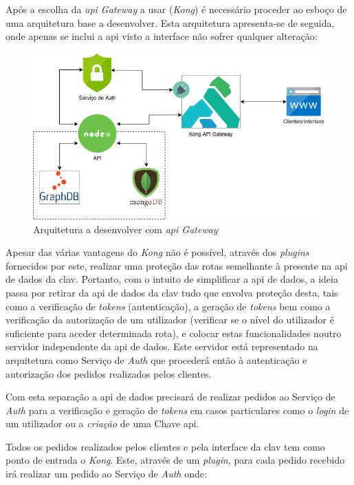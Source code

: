 Após a escolha da \textit{\acrshort{api} Gateway} a usar (\textit{Kong}) é necessário proceder ao esboço de uma arquitetura base a desenvolver. Esta arquitetura apresenta-se de seguida, onde apenas se inclui a \acrshort{api} visto a interface não sofrer qualquer alteração:
\begin{figure}[H]
    \centering
    \includegraphics[width=1\textwidth]{img/apiGatewayArch.png}
    \caption{Arquitetura a desenvolver com \textit{\acrshort{api} Gateway}}\label{fig:apiGatewayArch}
\end{figure}

Apesar das várias vantagens do \textit{Kong} não é possível, através dos \textit{plugins} fornecidos por este, realizar uma proteção das rotas semelhante à presente na \acrshort{api} de dados da \acrshort{clav}. Portanto, com o intuito de simplificar a \acrshort{api} de dados, a ideia passa por retirar da \acrshort{api} de dados da \acrshort{clav} tudo que envolva proteção desta, tais como a verificação de \textit{tokens} (autenticação), a geração de \textit{tokens} bem como a verificação da autorização de um utilizador (verificar se o nível do utilizador é suficiente para aceder determinada rota), e colocar estas funcionalidades noutro servidor independente da \acrshort{api} de dados. Este servidor está representado na arquitetura como Serviço de \textit{Auth} que procederá então à autenticação e autorização dos pedidos realizados pelos clientes.

Com esta separação a \acrshort{api} de dados precisará de realizar pedidos ao Serviço de \textit{Auth} para a verificação e geração de \textit{tokens} em casos particulares como o \textit{login} de um utilizador ou a \textit{criação} de uma Chave \acrshort{api}.

Todos os pedidos realizados pelos clientes e pela interface da \acrshort{clav} tem como ponto de entrada o \textit{Kong}. Este, através de um \textit{plugin}, para cada pedido recebido irá realizar um pedido ao Serviço de \textit{Auth} onde:


